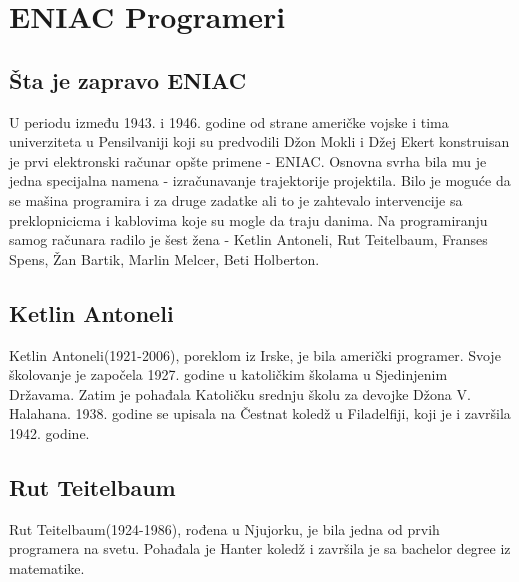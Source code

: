 \documentclass[a4paper,12pt]{article}
\begin{document}
\newpage
\section{ENIAC Programeri}

\subsection{Šta je zapravo ENIAC}
\begin{flushleft}

U periodu između 1943. i 1946. godine od strane američke vojske i tima univerziteta u Pensilvaniji koji su predvodili Džon Mokli i Džej Ekert konstruisan je prvi elektronski računar opšte primene - ENIAC. Osnovna svrha bila mu je jedna specijalna namena - izračunavanje trajektorije projektila. Bilo je moguće da se mašina programira i za druge zadatke ali to je zahtevalo intervencije sa preklopnicicma i kablovima koje su mogle da traju danima. Na programiranju samog računara radilo je šest žena - Ketlin Antoneli, Rut Teitelbaum, Franses Spens, Žan Bartik, Marlin Melcer, Beti Holberton.

\end{flushleft}

\subsection{Ketlin Antoneli}
\begin{flushleft}

Ketlin Antoneli(1921-2006), poreklom iz Irske, je bila američki programer. Svoje školovanje je započela 1927. godine u katoličkim školama u Sjedinjenim Državama. Zatim je pohađala Katoličku srednju školu za devojke Džona V. Halahana. 1938. godine se upisala na Čestnat koledž u Filadelfiji, koji je i završila 1942. godine.

\end{flushleft}

\subsection{Rut Teitelbaum}
\begin{flushleft}

Rut Teitelbaum(1924-1986), rođena u Njujorku, je bila jedna od prvih programera na svetu. Pohađala je Hanter koledž i završila je sa bachelor degree iz matematike.

\end{flushleft}
\end{document}
